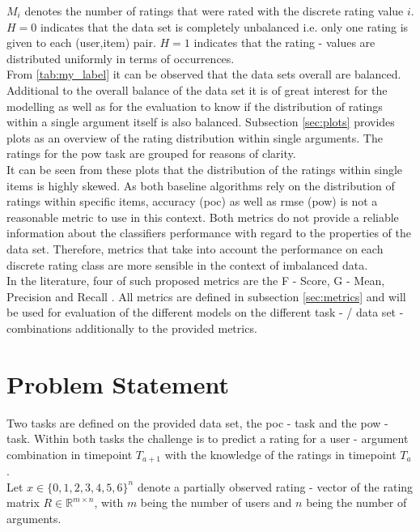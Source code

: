 \noindent $M_i$ denotes the number of ratings that were rated with the discrete rating value $i$.\\
\noindent $H=0$ indicates that the data set is completely unbalanced i.e. only one rating is given to each (user,item) pair. $H=1$ indicates that the rating - values are distributed uniformly in terms of occurrences.\\
From \autoref{tab:my_label} it can be observed that the data sets overall are balanced.  Additional to the overall balance of the data set it is of great interest for the modelling as well as for the evaluation to know if the distribution of ratings within a single argument itself is also balanced. Subsection \ref{sec:plots} provides plots as an overview of the rating distribution within single arguments. The ratings for the \acrshort{pow} task are grouped for reasons of clarity.\\
It can be seen from these plots that the distribution of the ratings within single items is highly skewed. As both baseline algorithms rely on the distribution of ratings within specific items, accuracy (\acrshort{poc}) as well as \acrfull{rmse} (\acrshort{pow}) is not a reasonable metric to use in this context. Both metrics do not provide a reliable information about the classifiers performance with regard to the properties of the data set. Therefore, metrics that take into account the performance on each discrete rating class are more sensible in the context of imbalanced data.\\
In the literature, four of such proposed metrics are the F - Score, G - Mean, Precision and Recall \cite{he2009learning}. All metrics are defined in subsection \ref{sec:metrics} and will be used for evaluation of the different models on the different task - / data set - combinations additionally to the provided metrics.

\section{Problem Statement}
\label{sec:problem}
Two tasks are defined on the provided data set, the \acrshort{poc} - task and the \acrshort{pow} - task. Within both tasks the challenge is to predict a rating for a user - argument combination in timepoint $T_{a+1}$ with the knowledge of the ratings in timepoint $T_a$.\\ Let $x \in \{0,1,2,3,4,5,6\}^{n}$ denote a partially observed rating - vector of the rating matrix $R \in \mathbb{R}^{m \times n}$, with $m$ being the number of users and $n$ being the number of arguments.
